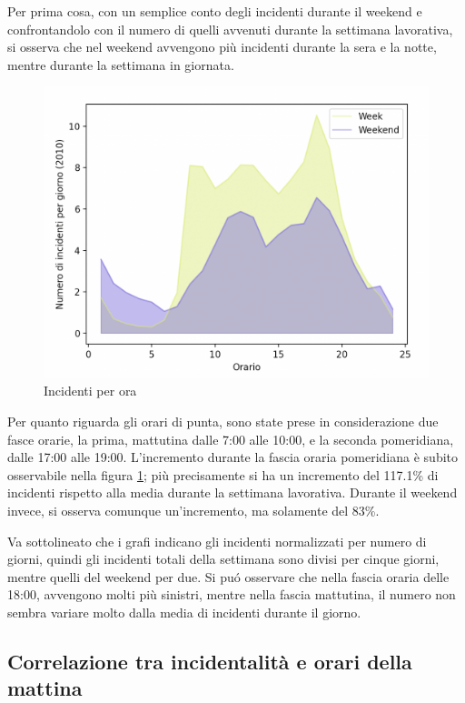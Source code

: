 \documentclass[a4paper]{report}
\begin{document}
Per prima cosa, con un semplice conto degli incidenti durante il weekend 
e confrontandolo con il numero di quelli avvenuti durante la 
settimana lavorativa, si osserva che nel weekend avvengono più incidenti 
durante la sera e la notte, mentre durante la settimana in giornata.

\begin{figure}
    \includegraphics[width=\linewidth]{../src/incidenti/incidenti_senza_coords/ore_punta/week_weekend.png}
    \caption{Incidenti per ora}
    \label{fig:week-weekend}
\end{figure}

Per quanto riguarda gli orari di punta, sono state prese in considerazione due fasce orarie, la prima, 
mattutina dalle 7:00 alle 10:00, e la seconda pomeridiana, dalle 17:00 alle 19:00.
L'incremento durante la fascia oraria pomeridiana è subito osservabile nella figura 
\ref{fig:week-weekend}; più precisamente si 
ha un incremento del 117.1\% di incidenti rispetto alla media durante la settimana lavorativa. 
Durante il weekend invece, si osserva comunque un'incremento, ma solamente del 83\%.

Va sottolineato che i grafi indicano gli incidenti normalizzati per numero di 
giorni, quindi gli incidenti totali della settimana sono divisi per cinque giorni, 
mentre quelli del weekend per due.
Si pu\'o osservare che nella fascia oraria delle 18:00, 
avvengono molti più sinistri, mentre nella fascia mattutina, 
il numero non sembra variare molto dalla media di incidenti durante il giorno.

\subsection{Correlazione tra incidentalità e orari della mattina}
\end{document}
